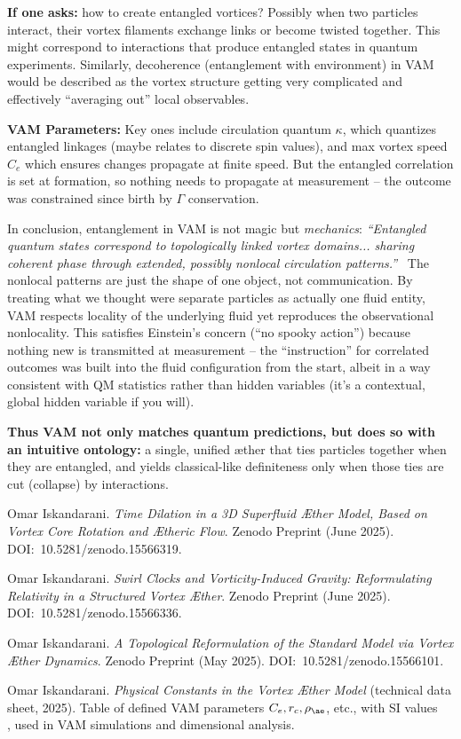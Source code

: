 \documentclass[a4paper, aps,preprint,superscriptaddress, 12pt]{revtex4}
\begin{document}
\textbf{If one asks:} how to create entangled vortices? Possibly when two particles interact, their vortex filaments exchange links or become twisted together. This might correspond to interactions that produce entangled states in quantum experiments. Similarly, decoherence (entanglement with environment) in VAM would be described as the vortex structure getting very complicated and effectively “averaging out” local observables.


\textbf{VAM Parameters:} Key ones include circulation quantum $\kappa$, which quantizes entangled linkages (maybe relates to discrete spin values), and max vortex speed $C_e$ which ensures changes propagate at finite speed. But the entangled correlation is set at formation, so nothing needs to propagate at measurement – the outcome was constrained since birth by $\Gamma$ conservation.


In conclusion, entanglement in VAM is not magic but \textit{mechanics}: \textit{“Entangled quantum states correspond to topologically linked vortex domains... sharing coherent phase through extended, possibly nonlocal circulation patterns.”}~\cite{Iskandarani2025c}  The nonlocal patterns are just the shape of one object, not communication. By treating what we thought were separate particles as actually one fluid entity, VAM respects locality of the underlying fluid yet reproduces the observational nonlocality. This satisfies Einstein’s concern (“no spooky action”) because nothing new is transmitted at measurement – the “instruction” for correlated outcomes was built into the fluid configuration from the start, albeit in a way consistent with QM statistics rather than hidden variables (it’s a contextual, global hidden variable if you will).


\textbf{Thus VAM not only matches quantum predictions, but does so with an intuitive ontology:} a single, unified æther that ties particles together when they are entangled, and yields classical-like definiteness only when those ties are cut (collapse) by interactions.



\begin{thebibliography}{99}


 Omar Iskandarani. \textit{Time Dilation in a 3D Superfluid Æther Model, Based on Vortex Core Rotation and Ætheric Flow}. Zenodo Preprint (June 2025). DOI:~10.5281/zenodo.15566319.


 Omar Iskandarani. \textit{Swirl Clocks and Vorticity-Induced Gravity: Reformulating Relativity in a Structured Vortex Æther}. Zenodo Preprint (June 2025). DOI:~10.5281/zenodo.15566336.


 Omar Iskandarani. \textit{A Topological Reformulation of the Standard Model via Vortex Æther Dynamics}. Zenodo Preprint (May 2025). DOI:~10.5281/zenodo.15566101.


 Omar Iskandarani. \textit{Physical Constants in the Vortex Æther Model} (technical data sheet, 2025). Table of defined VAM parameters $C_e, r_c, \rho_{\ae}$, etc., with SI values~\cite{VAM_constants} ~\cite{VAM_constants} , used in VAM simulations and dimensional analysis.


\end{thebibliography}
\end{document}
